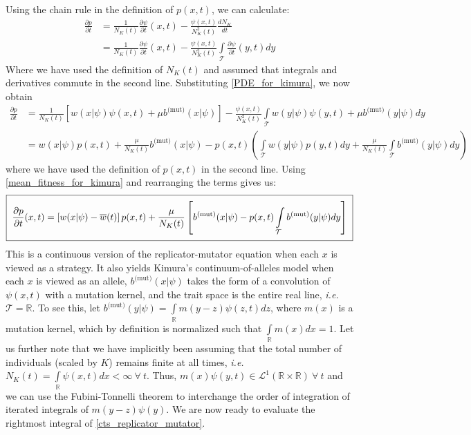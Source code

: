 Using the chain rule in the definition of $p(x,t)$, we can calculate:
\begin{align*}
\frac{\partial p}{\partial t} &= \frac{1}{N_K(t)}\frac{\partial \psi}{\partial t}(x,t) - \frac{\psi(x,t)}{N^2_K(t)}\frac{d N_K}{dt}\\
&= \frac{1}{N_K(t)}\frac{\partial \psi}{\partial t}(x,t) - \frac{\psi(x,t)}{N^2_K(t)}\int\limits_{\mathcal{T}}\frac{\partial \psi}{\partial t}(y,t)dy
\end{align*}
Where we have used the definition of $N_K(t)$ and assumed that integrals and derivatives commute in the second line. Substituting \eqref{PDE_for_kimura}, we now obtain
\begin{align*}
\frac{\partial p}{\partial t} &= \frac{1}{N_K(t)}\left[w(x|\psi)\psi(x,t) + \mu b^{\textrm{(mut)}}(x|\psi)\right] - \frac{\psi(x,t)}{N^2_K(t)}\int\limits_{\mathcal{T}}w(y|\psi)\psi(y,t) + \mu b^{\textrm{(mut)}}(y|\psi)dy\\
&= w(x|\psi)p(x,t) + \frac{\mu}{N_{K}(t)} b^{\textrm{(mut)}}(x|\psi) - p(x,t)\left(\int\limits_{\mathcal{T}}w(y|\psi)p(y,t)dy+\frac{\mu}{N_K(t)}\int\limits_{\mathcal{T}} b^{\textrm{(mut)}}(y|\psi)dy\right)
\end{align*}
where we have used the definition of $p(x,t)$ in the second line. Using \eqref{mean_fitness_for_kimura} and rearranging the terms gives us:
\begin{equation}
\label{cts_replicator_mutator}
\setlength{\fboxsep}{2\fboxsep}\boxed{\frac{\partial p}{\partial t}(x,t) = \left[w(x|\psi) - \overline{w}(t)\right]p(x,t)+\frac{\mu}{N_K(t)}\left[b^{\textrm{(mut)}}(x|\psi) - p(x,t)\int\limits_{\mathcal{T}} b^{\textrm{(mut)}}(y|\psi)dy\right]}
\end{equation}
This is a continuous version of the replicator-mutator equation when each $x$ is viewed as a strategy. It also yields Kimura's continuum-of-alleles model when each $x$ is viewed as an allele, $b^{\textrm{(mut)}}(x|\psi)$ takes the form of a convolution of $\psi(x,t)$ with a mutation kernel, and the trait space is the entire real line, \emph{i.e.} $\mathcal{T} = \mathbb{R}$. To see this, let $b^{\textrm{(mut)}}(y|\psi) = \int\limits_{\mathbb{R}}m(y-z)\psi(z,t)dz$, where $m(x)$ is a mutation kernel, which by definition is normalized such that $\int\limits_{\mathbb{R}}m(x)dx = 1$. Let us further note that we have implicitly been assuming that the total number of individuals (scaled by $K$) remains finite at all times, \emph{i.e.} $N_K(t) = \int\limits_{\mathbb
R}\psi(x,t)dx < \infty \ \forall \ t$. Thus, $m(x)\psi(y,t) \in  \mathcal{L}^{1}(\mathbb{R}\times\mathbb{R}) \ \forall \ t$ and we can use the Fubini-Tonnelli theorem to interchange the order of integration of iterated integrals of $m(y-z)\psi(y)$. We are now ready to evaluate the rightmost integral of \eqref{cts_replicator_mutator}.\\
